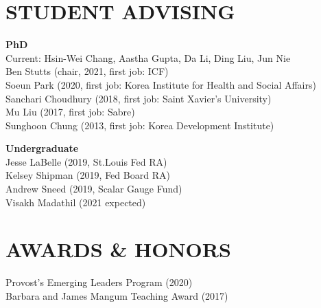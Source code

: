 \documentclass[11pt]{res}
\begin{document}
\begin{resume}
\section{STUDENT ADVISING} \vspace{1.5mm}
\textbf{PhD}\vspace{1.5mm}\\
Current: Hsin-Wei Chang, Aastha Gupta, Da Li, Ding Liu, Jun Nie\vspace{1.5mm}\\
Ben Stutts (chair, 2021, first job: ICF)\vspace{1.5mm}\\
Soeun Park (2020, first job: Korea Institute for Health and Social Affairs)\vspace{1.5mm}\\
Sanchari Choudhury (2018, first job: Saint Xavier's University)\vspace{1.5mm}\\
Mu Liu (2017, first job: Sabre)\vspace{1.5mm}\\
Sunghoon Chung (2013, first job: Korea Development Institute)

\textbf{Undergraduate}\vspace{1.5mm}\\
Jesse LaBelle (2019, St.Louis Fed RA)\vspace{1.5mm}\\
Kelsey Shipman (2019, Fed Board RA)\vspace{1.5mm}\\
Andrew Sneed (2019, Scalar Gauge Fund)\vspace{1.5mm}\\
Visakh Madathil (2021 expected)

\section{AWARDS \& HONORS} \vspace{1.5mm}
Provost's Emerging Leaders Program (2020)\vspace{1.5mm}\\
Barbara and James Mangum Teaching Award (2017)


\end{resume}
\end{document}

